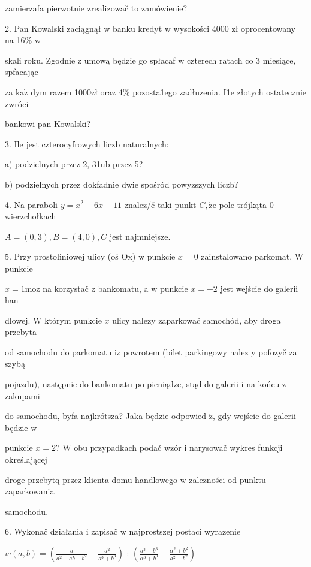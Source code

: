 \documentclass[a4paper,12pt]{article}
\begin{document}
zamierzafa pierwotnie zrealizowač to zamówienie?

2. Pan Kowalski zaciągnął $\mathrm{w}$ banku kredyt $\mathrm{w}$ wysokości 4000 zł oprocentowany na 16\% $\mathrm{w}$

skali roku. Zgodnie $\mathrm{z}$ umową będzie go spłacaf $\mathrm{w}$ czterech ratach co 3 miesiące, spfacając

za $\mathrm{k}\mathrm{a}\dot{\mathrm{z}}$ dym razem 1000zł oraz 4\% pozosta1ego zadłuzenia. I1e złotych ostatecznie zwróci

bankowi pan Kowalski?

3. Ile jest czterocyfrowych liczb naturalnych:

a) podzielnych przez 2, 31ub przez 5?

b) podzielnych przez dokfadnie dwie spośród powyzszych liczb?

4. Na paraboli $y=x^{2}-6x+11$ znalez/č taki punkt $C, \dot{\mathrm{z}}\mathrm{e}$ pole trójkąta $0$ wierzchołkach

$A=(0,3), B=(4,0), C$ jest najmniejsze.

5. Przy prostoliniowej ulicy (oś Ox) $\mathrm{w}$ punkcie $x=0$ zainstalowano parkomat. $\mathrm{W}$ punkcie

$x=1 \mathrm{m}\mathrm{o}\dot{\mathrm{z}}$ na korzystač $\mathrm{z}$ bankomatu, a $\mathrm{w}$ punkcie $x=-2$ jest wejście do galerii han-

dlowej. $\mathrm{W}$ którym punkcie $x$ ulicy nalezy zaparkowač samochód, aby droga przebyta

od samochodu do parkomatu $\mathrm{i}\mathrm{z}$ powrotem (bilet parkingowy nalez $\mathrm{y}$ pofozyč za szybą

pojazdu), następnie do bankomatu po pieniądze, stąd do galerii $\mathrm{i}$ na końcu $\mathrm{z}$ zakupami

do samochodu, byfa najkrótsza? Jaka będzie odpowied $\acute{\mathrm{z}}$, gdy wejście do galerii będzie $\mathrm{w}$

punkcie $x=2$? $\mathrm{W}$ obu przypadkach podač wzór $\mathrm{i}$ narysowač wykres funkcji określającej

droge przebytq przez klienta domu handlowego $\mathrm{w}$ zalezności od punktu zaparkowania

samochodu.

6. Wykonač działania $\mathrm{i}$ zapisač $\mathrm{w}$ najprostszej postaci wyrazenie

$w(a,b)= (\displaystyle \frac{a}{a^{2}-ab+b^{2}}-\frac{a^{2}}{a^{3}+b^{3}})$ : $(\displaystyle \frac{a^{3}-b^{3}}{\alpha^{3}+b^{3}}-\frac{\alpha^{2}+b^{2}}{a^{2}-b^{2}})$
\end{document}
